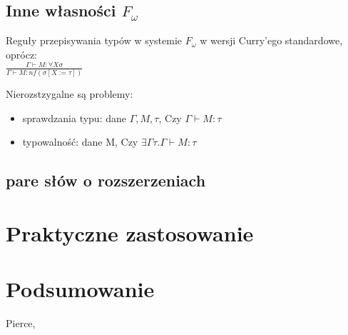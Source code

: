\documentclass[11pt,leqno]{article}
\begin{document}
\subsection{Inne własności $F_\omega$}

\begin{definicja}
Reguły przepisywania typów w systemie $F_{\omega}$ w wersji Curry'ego standardowe, oprócz: \\

$\frac{\Gamma \vdash M : \forall X \sigma}{\Gamma \vdash M : nf(\sigma [ X := \tau ])}$

\end{definicja}


Nierozstzygalne są problemy:
    \begin{itemize}
        \item sprawdzania typu: dane $\Gamma, M, \tau$, Czy $\Gamma \vdash M : \tau$
        \item typowalność: dane M, Czy $\exists \Gamma \tau . \Gamma \vdash M : \tau$
    \end{itemize}


\subsection{pare słów o rozszerzeniach}

\section{Praktyczne zastosowanie}                       
\setcounter{equation}{0}


\section{Podsumowanie}                       
\setcounter{equation}{0}




\thispagestyle{empty}
\begin{thebibliography}{99}

 Pierce, \textit{} 


	  
\end{thebibliography}
\end{document}
